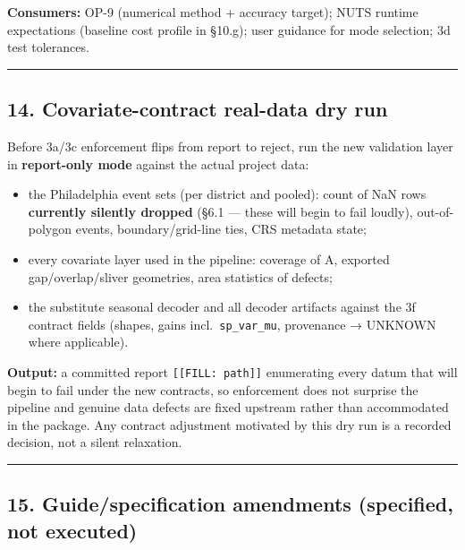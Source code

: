 \documentclass[
  10pt,
]{article}
\providecommand{\tightlist}{%
  \setlength{\itemsep}{0pt}\setlength{\parskip}{0pt}}
\begin{document}
\textbf{Consumers:} OP-9 (numerical method + accuracy target); NUTS runtime expectations (baseline cost profile in §10.g); user guidance for mode selection; 3d test tolerances.

\begin{center}\rule{0.5\linewidth}{0.5pt}\end{center}

\hypertarget{covariate-contract-real-data-dry-run}{%
\subsection{14. Covariate-contract real-data dry run}\label{covariate-contract-real-data-dry-run}}

Before 3a/3c enforcement flips from report to reject, run the new validation layer in \textbf{report-only mode} against the actual project data:

\begin{itemize}
\tightlist
\item
  the Philadelphia event sets (per district and pooled): count of NaN rows \textbf{currently silently dropped} (§6.1 --- these will begin to fail loudly), out-of-polygon events, boundary/grid-line ties, CRS metadata state;
\item
  every covariate layer used in the pipeline: coverage of A, exported gap/overlap/sliver geometries, area statistics of defects;
\item
  the substitute seasonal decoder and all decoder artifacts against the 3f contract fields (shapes, gains incl.~\texttt{sp\_var\_mu}, provenance → UNKNOWN where applicable).
\end{itemize}

\textbf{Output:} a committed report \texttt{{[}{[}FILL:\ path{]}{]}} enumerating every datum that will begin to fail under the new contracts, so enforcement does not surprise the pipeline and genuine data defects are fixed upstream rather than accommodated in the package. Any contract adjustment motivated by this dry run is a recorded decision, not a silent relaxation.

\begin{center}\rule{0.5\linewidth}{0.5pt}\end{center}

\hypertarget{guidespecification-amendments-specified-not-executed}{%
\subsection{15. Guide/specification amendments (specified, not executed)}\label{guidespecification-amendments-specified-not-executed}}
\end{document}
